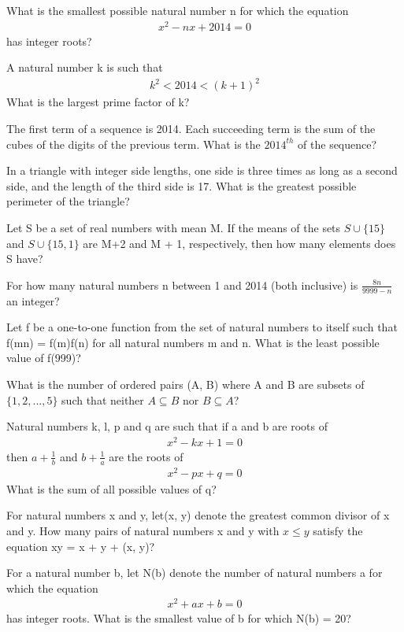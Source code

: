 \item What is the smallest possible natural number n for which the equation 
\begin{align*}
x^2 - nx + 2014 = 0
\end{align*}
has integer roots?

\item A natural number k is such that 
\begin{align*}
k^2 < 2014 < (k+1)^2
\end{align*}
What is the largest prime factor of k?

\item The first term of a sequence is 2014. Each succeeding term is the sum of the cubes of the digits of the previous term. What is the $2014^{th}$ of the sequence?

\item In a triangle with integer side lengths, one side is three times as long as a second side, and the length of the third side is 17. What is the greatest possible perimeter of the triangle? 

\item Let S be a set of real numbers with mean M. If the means of the sets $S \cup \{15\}$ and $S \cup \{15,1\}$ are M+2 and M + 1, respectively, then how many elements does S have?

\item For how many natural numbers n between 1 and 2014 (both inclusive) is $\frac{8n}{9999-n}$ an integer?


\item Let f be a one-to-one function from the set of natural numbers to itself such that f(mn) = f(m)f(n) for all natural numbers m and n. What is the least possible value of f(999)?


\item What is the number of ordered pairs (A, B) where A and B are subsets of $\{1,2,...,5\}$ such that neither 
$A \subseteq B$ nor $B \subseteq A$?

\item Natural numbers k, l, p and q are such that if a and b are roots of 
\begin{align*}
x^2 - kx + 1 = 0
\end{align*}
then $a + \frac{1}{b}$ and $b + \frac{1}{a}$ are the roots of 
\begin{align*}
x^2 - px + q = 0
\end{align*}
What is the sum of all possible values of q?

\item For natural numbers x and y, let(x, y) denote the greatest common divisor of x and y. How many pairs of natural numbers x and y with $x \leq y$ satisfy the equation xy = x + y + (x, y)?

\item For a natural number b, let N(b) denote the number of natural numbers a for which the equation 
\begin{align*}
x^2 + a x + b = 0
\end{align*}
has integer roots. What is the smallest value of b for which N(b) = 20?




